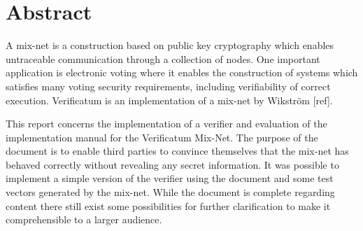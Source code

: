 \section{Abstract}

A mix-net is a construction based on public key cryptography which enables untraceable communication through a collection of nodes. One important application is electronic voting where it enables the construction of systems which satisfies many voting security requirements, including verifiability of correct execution. Verificatum is an implementation of a mix-net by Wikström [ref].

This report concerns the implementation of a verifier and evaluation of the implementation manual for the Verificatum Mix-Net. The purpose of the document is to enable third parties to convince themselves that the mix-net has behaved correctly without revealing any secret information. It was possible to implement a simple version of the verifier using the document and some test vectors generated by the mix-net. While the document is complete regarding content there still exist some possibilities for further clarification to make it comprehensible to a larger audience.